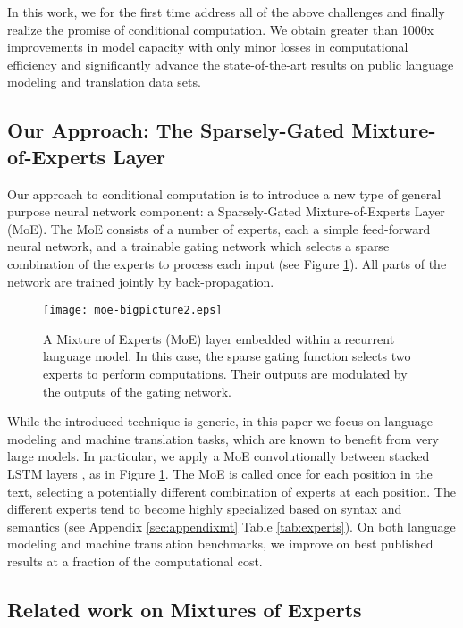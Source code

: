 \documentclass{article} \pdfoutput=1
\begin{document}
 In this work, we for the first time address all of the above challenges and finally realize the promise of conditional computation. We obtain greater than 1000x improvements in model capacity with only minor losses in computational efficiency and significantly advance the state-of-the-art results on public language modeling and translation data sets.
 
\subsection{Our Approach: The Sparsely-Gated Mixture-of-Experts Layer}

Our approach to conditional computation is to introduce a new type of general purpose neural network component: a Sparsely-Gated Mixture-of-Experts Layer (MoE).  The MoE consists of a number of experts, each a simple feed-forward neural network, and a trainable gating network which selects a sparse combination of the experts to process each input (see Figure \ref{fig:moe}).  All parts of the network are trained jointly by back-propagation.


\begin{figure}
    \texttt{[image: moe-bigpicture2.eps]}
    \caption{A Mixture of Experts (MoE) layer embedded within a recurrent language model. In this case, the sparse gating function selects two experts to perform computations. Their outputs are modulated by the outputs of the gating network.}
    \label{fig:moe}
\end{figure}

While the introduced technique is generic, in this paper we focus on language modeling and machine translation tasks, which are known to benefit from very large models. In particular, we apply a MoE convolutionally between stacked LSTM layers \citep{Hochreiter:1997:LSM}, as in Figure \ref{fig:moe}.  The MoE is called once for each position in the text, selecting a potentially different combination of experts at each position.  The different experts tend to become highly specialized based on syntax and semantics (see Appendix \ref{sec:appendixmt} Table \ref{tab:experts}).  On both language modeling and machine translation benchmarks, we improve on best published results at a fraction of the computational cost.

\subsection{Related work on Mixtures of Experts}
\end{document}
